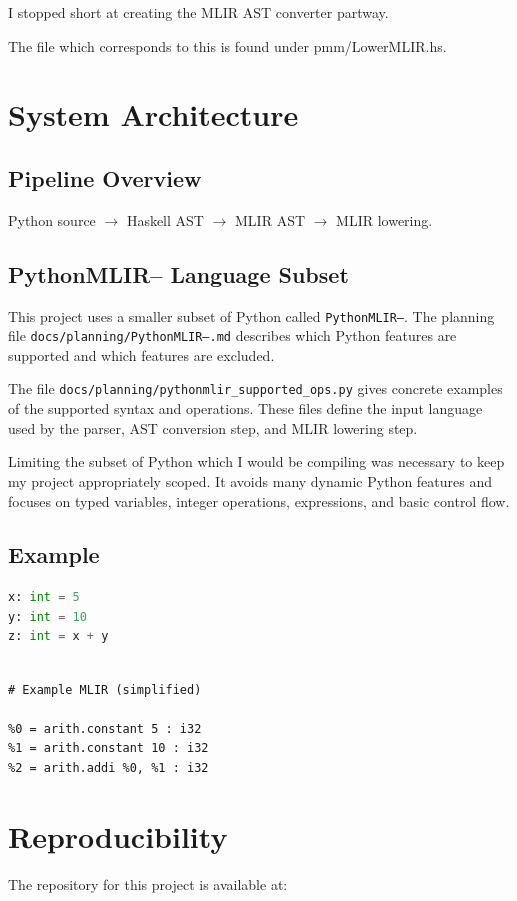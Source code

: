 \documentclass[11pt]{article}
\begin{document}
I stopped short at creating the MLIR AST converter partway.

The file which corresponds to this is found under pmm/LowerMLIR.hs.

\section{System Architecture}
\subsection{Pipeline Overview}
Python source $\rightarrow$ Haskell AST $\rightarrow$ MLIR AST $\rightarrow$
MLIR lowering.

\subsection{PythonMLIR-- Language Subset}

This project uses a smaller subset of Python called \texttt{PythonMLIR--}. The
planning file \texttt{docs/planning/PythonMLIR--.md} describes which Python
features are supported and which features are excluded.

The file \texttt{docs/planning/pythonmlir\_supported\_ops.py} gives concrete
examples of the supported syntax and operations. These files define the input
language used by the parser, AST conversion step, and MLIR lowering step.

Limiting the subset of Python which I would be compiling was necessary to keep
my project appropriately scoped. It avoids many dynamic Python features and
focuses on typed variables, integer operations, expressions, and basic control
flow.

\subsection{Example}
\begin{lstlisting}[language=Python]
x: int = 5
y: int = 10
z: int = x + y
\end{lstlisting}

\begin{lstlisting}

# Example MLIR (simplified)

%0 = arith.constant 5 : i32
%1 = arith.constant 10 : i32
%2 = arith.addi %0, %1 : i32
\end{lstlisting}

\section{Reproducibility}
The repository for this project is available at:
\end{document}
